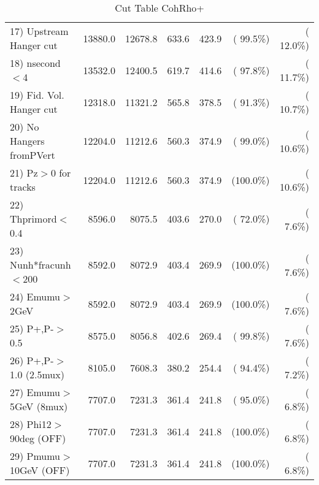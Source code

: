 \begin{table}[h!]
\begin{tabular}{||l||r|r|r|r|r|r||}
 17) Upstream Hanger cut  &      13880.0 &      12678.8 &        633.6 &        423.9 & ( 99.5\%) & ( 12.0\%) \\
 18) nsecond$<$4          &      13532.0 &      12400.5 &        619.7 &        414.6 & ( 97.8\%) & ( 11.7\%) \\
 19) Fid. Vol. Hanger cut &      12318.0 &      11321.2 &        565.8 &        378.5 & ( 91.3\%) & ( 10.7\%) \\
 20) No Hangers fromPVert &      12204.0 &      11212.6 &        560.3 &        374.9 & ( 99.0\%) & ( 10.6\%) \\
 21) Pz$>$0 for tracks    &      12204.0 &      11212.6 &        560.3 &        374.9 & (100.0\%) & ( 10.6\%) \\
 22) Thprimord$<$0.4      &       8596.0 &       8075.5 &        403.6 &        270.0 & ( 72.0\%) & (  7.6\%) \\
 23) Nunh*fracunh$<$200   &       8592.0 &       8072.9 &        403.4 &        269.9 & (100.0\%) & (  7.6\%) \\
 24) Emumu$>$2GeV         &       8592.0 &       8072.9 &        403.4 &        269.9 & (100.0\%) & (  7.6\%) \\
 25) P+,P-$>$0.5          &       8575.0 &       8056.8 &        402.6 &        269.4 & ( 99.8\%) & (  7.6\%) \\
 26) P+,P-$>$1.0 (2.5mux) &       8105.0 &       7608.3 &        380.2 &        254.4 & ( 94.4\%) & (  7.2\%) \\
 27) Emumu$>$5GeV  (8mux) &       7707.0 &       7231.3 &        361.4 &        241.8 & ( 95.0\%) & (  6.8\%) \\
 28) Phi12$>$90deg  (OFF) &       7707.0 &       7231.3 &        361.4 &        241.8 & (100.0\%) & (  6.8\%) \\
 29) Pmumu$>$10GeV  (OFF) &       7707.0 &       7231.3 &        361.4 &        241.8 & (100.0\%) & (  6.8\%) \\
 \hline
 \hline
 \end{tabular}
 \caption{Cut Table  CohRho+  }
 \label{tab-cutcohjpsi-mumu_cohrhop}
 \end{table}
